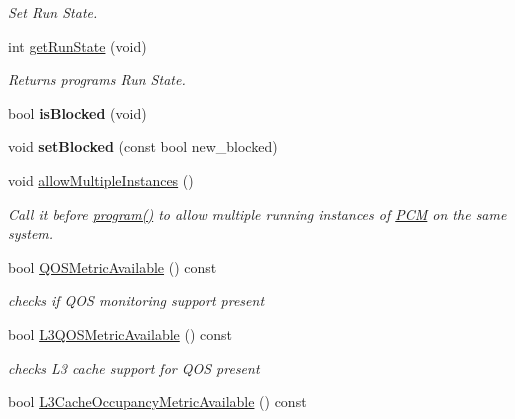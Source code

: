 \begin{DoxyCompactItemize}
\begin{DoxyCompactList}\small\item\em Set Run State. \end{DoxyCompactList}\item 
\mbox{\label{class_p_c_m_a5fc8a2d2073ce855558d201883ecf3cd}} 
int \mbox{\hyperlink{class_p_c_m_a5fc8a2d2073ce855558d201883ecf3cd}{get\+Run\+State}} (void)
\begin{DoxyCompactList}\small\item\em Returns program\textquotesingle{}s Run State. \end{DoxyCompactList}\item 
\mbox{\label{class_p_c_m_ab665ed42ffe2818dbc4f44e6b7ea5436}} 
bool {\bfseries is\+Blocked} (void)
\item 
\mbox{\label{class_p_c_m_ad61cae141755617819b1a81d5fac91d3}} 
void {\bfseries set\+Blocked} (const bool new\+\_\+blocked)
\item 
\mbox{\label{class_p_c_m_a4261a7c1980c16cfe289856401aa3bee}} 
void \mbox{\hyperlink{class_p_c_m_a4261a7c1980c16cfe289856401aa3bee}{allow\+Multiple\+Instances}} ()
\begin{DoxyCompactList}\small\item\em Call it before \mbox{\hyperlink{class_p_c_m_abae9577a1a172c944d133bef10683825}{program()}} to allow multiple running instances of \mbox{\hyperlink{class_p_c_m}{P\+CM}} on the same system. \end{DoxyCompactList}\item 
bool \mbox{\hyperlink{class_p_c_m_ad12300d8a7096cc4258108ced23cd491}{Q\+O\+S\+Metric\+Available}} () const
\begin{DoxyCompactList}\small\item\em checks if Q\+OS monitoring support present \end{DoxyCompactList}\item 
bool \mbox{\hyperlink{class_p_c_m_ab1be879d2c871816ddbcfa30bb58a3e7}{L3\+Q\+O\+S\+Metric\+Available}} () const
\begin{DoxyCompactList}\small\item\em checks L3 cache support for Q\+OS present \end{DoxyCompactList}\item 
bool \mbox{\hyperlink{class_p_c_m_a6a6580b296a5a0236c9e00956988c0fc}{L3\+Cache\+Occupancy\+Metric\+Available}} () const

\end{DoxyCompactItemize}
